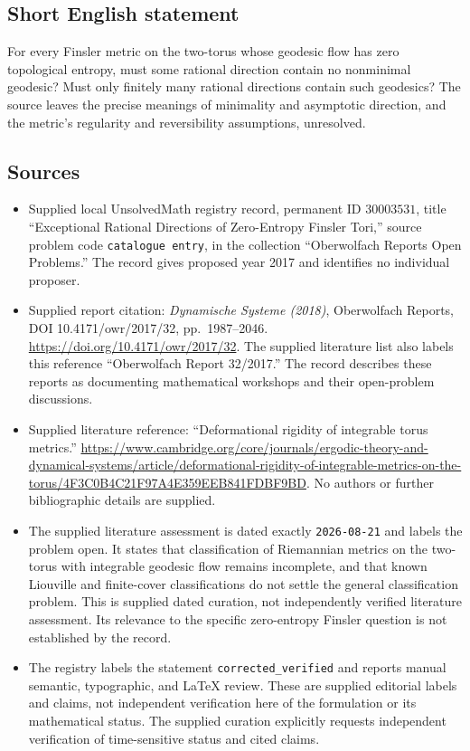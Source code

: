 \documentclass[11pt]{article}
\begin{document}
\subsection{Short English statement}
For every Finsler metric on the two-torus whose geodesic flow has zero topological entropy, must some rational direction contain no nonminimal geodesic? Must only finitely many rational directions contain such geodesics? The source leaves the precise meanings of minimality and asymptotic direction, and the metric's regularity and reversibility assumptions, unresolved.
\subsection{Sources}
\begin{itemize}
\item Supplied local UnsolvedMath registry record, permanent ID \(30003531\), title ``Exceptional Rational Directions of Zero-Entropy Finsler Tori,'' source problem code \texttt{catalogue entry}, in the collection ``Oberwolfach Reports Open Problems.'' The record gives proposed year 2017 and identifies no individual proposer.
\item Supplied report citation: \emph{Dynamische Systeme (2018)}, Oberwolfach Reports, DOI 10.4171/owr/2017/32, pp.~1987--2046. \url{https://doi.org/10.4171/owr/2017/32}. The supplied literature list also labels this reference ``Oberwolfach Report 32/2017.'' The record describes these reports as documenting mathematical workshops and their open-problem discussions.
\item Supplied literature reference: ``Deformational rigidity of integrable torus metrics.'' \url{https://www.cambridge.org/core/journals/ergodic-theory-and-dynamical-systems/article/deformational-rigidity-of-integrable-metrics-on-the-torus/4F3C0B4C21F97A4E359EEB841FDBF9BD}. No authors or further bibliographic details are supplied.
\item The supplied literature assessment is dated exactly \texttt{2026-08-21} and labels the problem open. It states that classification of Riemannian metrics on the two-torus with integrable geodesic flow remains incomplete, and that known Liouville and finite-cover classifications do not settle the general classification problem. This is supplied dated curation, not independently verified literature assessment. Its relevance to the specific zero-entropy Finsler question is not established by the record.
\item The registry labels the statement \texttt{corrected\_verified} and reports manual semantic, typographic, and LaTeX review. These are supplied editorial labels and claims, not independent verification here of the formulation or its mathematical status. The supplied curation explicitly requests independent verification of time-sensitive status and cited claims.
\end{itemize}
\end{document}
